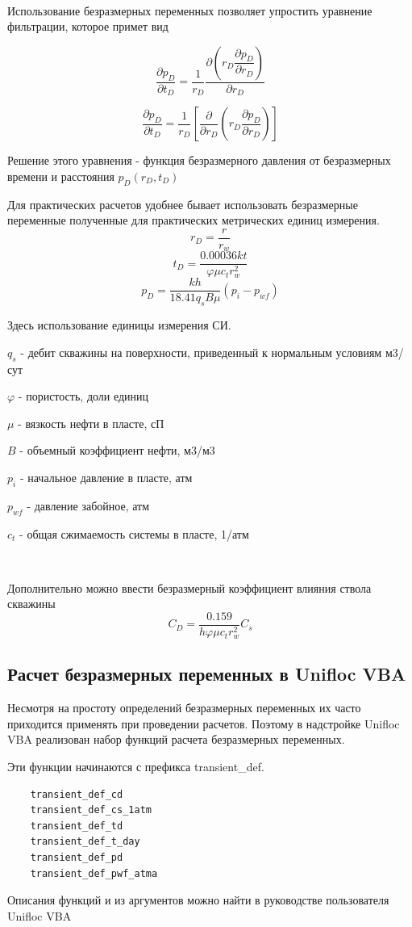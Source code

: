 \

Использование безразмерных переменных позволяет упростить уравнение фильтрации, которое примет вид

$$ \frac{\partial p_D}{ \partial t_D} = \frac{1}{r_D} \frac{ \partial{ \left( r_D \dfrac{\partial p_D}{ \partial r_D} \right) } }{ \partial{r_D} } $$

	
$$ 
\frac{\partial p_D}{ \partial t_D} = \dfrac{1}{r_D} \left[ \dfrac{\partial}{\partial r_D} \left( r_D \dfrac{ \partial p_D} {\partial r_D} \right) \right] 
$$

Решение этого уравнения - функция безразмерного давления от безразмерных времени и расстояния $p_D(r_D, t_D) $

Для практических расчетов удобнее бывает использовать безразмерные переменные полученные для практических метрических единиц измерения. 
$$ r_D = \frac{r}{r_w} $$
$$ t_D = \frac{0.00036 kt}{\varphi \mu c_t r_w^2}$$
$$ p_D = \frac{kh}{ 18.41 q_s B \mu} \left( p_i - p_{wf} \right) $$

Здесь использование единицы измерения СИ. 

$q_s$ - дебит скважины на поверхности, приведенный к нормальным условиям м3/сут

$\varphi$ - пористость, доли единиц

$\mu$ - вязкость нефти в пласте, сП

$B$ - объемный коэффициент нефти, м3/м3

$p_i$ - начальное давление в пласте, атм

$p_{wf}$ - давление забойное, атм

$c_t$ - общая сжимаемость системы в пласте, 1/атм

\

Дополнительно можно ввести безразмерный коэффициент влияния ствола скважины
$$ C_D = \frac{0.159}{ h \varphi \mu c_t r_w^2 } C_s $$

\subsection{Расчет безразмерных переменных в Unifloc VBA}

Несмотря на простоту определений безразмерных переменных их часто приходится применять при проведении расчетов. Поэтому в надстройке Unifloc VBA реализован набор функций расчета безразмерных переменных.

Эти функции начинаются с префикса  transient\_def.

\begin{verbatim}
	transient_def_cd
	transient_def_cs_1atm
	transient_def_td
	transient_def_t_day
	transient_def_pd
	transient_def_pwf_atma
\end{verbatim}	

Описания функций и из аргументов можно найти в руководстве пользователя  Unifloc VBA

